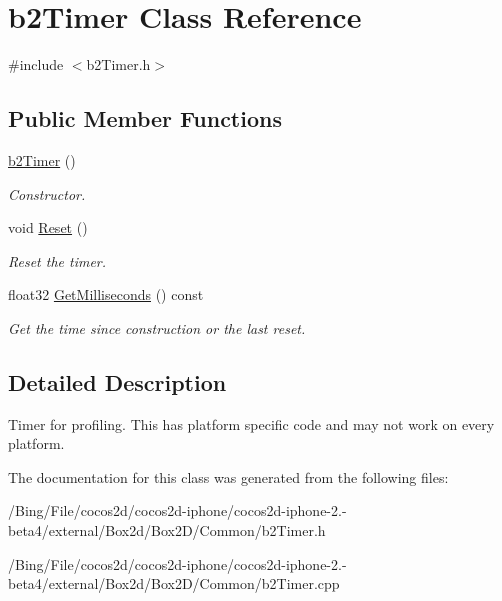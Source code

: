 \hypertarget{classb2_timer}{\section{b2\-Timer Class Reference}
\label{classb2_timer}
}


{\ttfamily \#include $<$b2\-Timer.\-h$>$}

\subsection*{Public Member Functions}
\begin{DoxyCompactItemize}
\item 
\hypertarget{classb2_timer_afcc159032a8edeaa9febdf2b6cbd49a5}{\hyperlink{classb2_timer_afcc159032a8edeaa9febdf2b6cbd49a5}{b2\-Timer} ()}\label{classb2_timer_afcc159032a8edeaa9febdf2b6cbd49a5}

\begin{DoxyCompactList}\small\item\em Constructor. \end{DoxyCompactList}\item 
\hypertarget{classb2_timer_a367388794588e9283600437be82f2889}{void \hyperlink{classb2_timer_a367388794588e9283600437be82f2889}{Reset} ()}\label{classb2_timer_a367388794588e9283600437be82f2889}

\begin{DoxyCompactList}\small\item\em Reset the timer. \end{DoxyCompactList}\item 
\hypertarget{classb2_timer_a354e020ec583a067b8f3b90a42a88e53}{float32 \hyperlink{classb2_timer_a354e020ec583a067b8f3b90a42a88e53}{Get\-Milliseconds} () const }\label{classb2_timer_a354e020ec583a067b8f3b90a42a88e53}

\begin{DoxyCompactList}\small\item\em Get the time since construction or the last reset. \end{DoxyCompactList}\end{DoxyCompactItemize}


\subsection{Detailed Description}
Timer for profiling. This has platform specific code and may not work on every platform. 

The documentation for this class was generated from the following files\-:\begin{DoxyCompactItemize}
\item 
/\-Bing/\-File/cocos2d/cocos2d-\/iphone/cocos2d-\/iphone-\/2.-\/beta4/external/\-Box2d/\-Box2\-D/\-Common/b2\-Timer.\-h\item 
/\-Bing/\-File/cocos2d/cocos2d-\/iphone/cocos2d-\/iphone-\/2.-\/beta4/external/\-Box2d/\-Box2\-D/\-Common/b2\-Timer.\-cpp\end{DoxyCompactItemize}
